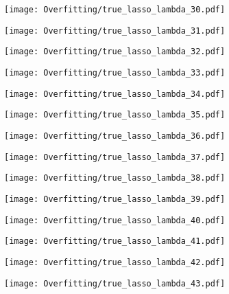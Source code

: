 \documentclass[xcolor=pdftex,dvipsnames,table]{beamer}
\begin{document}
\frame
{
	\begin{center}
		\texttt{[image: Overfitting/true\_lasso\_lambda\_30.pdf]}
	\end{center}
}
\frame
{
	\begin{center}
		\texttt{[image: Overfitting/true\_lasso\_lambda\_31.pdf]}
	\end{center}
}
\frame
{
	\begin{center}
		\texttt{[image: Overfitting/true\_lasso\_lambda\_32.pdf]}
	\end{center}
}
\frame
{
	\begin{center}
		\texttt{[image: Overfitting/true\_lasso\_lambda\_33.pdf]}
	\end{center}
}
\frame
{
	\begin{center}
		\texttt{[image: Overfitting/true\_lasso\_lambda\_34.pdf]}
	\end{center}
}
\frame
{
	\begin{center}
		\texttt{[image: Overfitting/true\_lasso\_lambda\_35.pdf]}
	\end{center}
}
\frame
{
	\begin{center}
		\texttt{[image: Overfitting/true\_lasso\_lambda\_36.pdf]}
	\end{center}
}
\frame
{
	\begin{center}
		\texttt{[image: Overfitting/true\_lasso\_lambda\_37.pdf]}
	\end{center}
}
\frame
{
	\begin{center}
		\texttt{[image: Overfitting/true\_lasso\_lambda\_38.pdf]}
	\end{center}
}
\frame
{
	\begin{center}
		\texttt{[image: Overfitting/true\_lasso\_lambda\_39.pdf]}
	\end{center}
}
\frame
{
	\begin{center}
		\texttt{[image: Overfitting/true\_lasso\_lambda\_40.pdf]}
	\end{center}
}
\frame
{
	\begin{center}
		\texttt{[image: Overfitting/true\_lasso\_lambda\_41.pdf]}
	\end{center}
}
\frame
{
	\begin{center}
		\texttt{[image: Overfitting/true\_lasso\_lambda\_42.pdf]}
	\end{center}
}
\frame
{
	\begin{center}
		\texttt{[image: Overfitting/true\_lasso\_lambda\_43.pdf]}
	\end{center}
}
\end{document}

